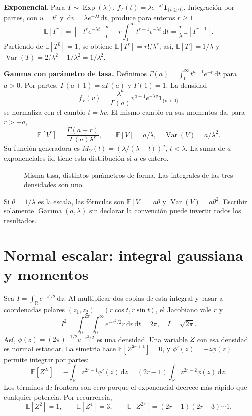 \documentclass[11pt,a4paper]{article}
\newcommand{\R}{\mathbb R}
\newcommand{\E}{\mathbb E}
\newcommand{\dd}{\,\mathrm d}
\newcommand{\ind}{\mathbf 1}
\DeclareMathOperator{\Var}{Var}
\newcommand{\topic}[2]{\clearpage\section{#1}\label{#2}}
\theoremstyle{definition}\newtheorem{definicion}[teorema]{Definición}
\begin{document}
\textbf{Exponencial.} Para $T\sim\operatorname{Exp}(\lambda)$,
$f_T(t)=\lambda e^{-\lambda t}\ind_{\{t\ge0\}}$.
Integración por partes, con $u=t^r$ y $\dd v=\lambda e^{-\lambda t}\dd t$,
produce para enteros $r\ge1$
\[
\E[T^r]
=\left[-t^re^{-\lambda t}\right]_0^\infty
+r\int_0^\infty t^{r-1}e^{-\lambda t}\dd t
=\frac r\lambda\E[T^{r-1}].
\]
Partiendo de $\E[T^0]=1$, se obtiene
$\E[T^r]=r!/\lambda^r$; así, $\E[T]=1/\lambda$ y
$\Var(T)=2/\lambda^2-1/\lambda^2=1/\lambda^2$.

\textbf{Gamma con parámetro de tasa.} Definimos
$\Gamma(a)=\int_0^\infty t^{a-1}e^{-t}\dd t$ para $a>0$.
Por partes, $\Gamma(a+1)=a\Gamma(a)$ y $\Gamma(1)=1$.
La densidad
\[
f_V(v)=\frac{\lambda^a}{\Gamma(a)}v^{a-1}e^{-\lambda v}
\ind_{\{v>0\}}
\]
se normaliza con el cambio $t=\lambda v$. El mismo cambio en sus momentos
da, para $r>-a$,
\[
\E[V^r]=\frac{\Gamma(a+r)}{\Gamma(a)\lambda^r},
\qquad \boxed{\E[V]=a/\lambda,\quad \Var(V)=a/\lambda^2}.
\]
Su función generadora es $M_V(t)=(\lambda/(\lambda-t))^a$, $t<\lambda$.
La suma de $a$ exponenciales iid tiene esta distribución si $a$ es entero.

\begin{figure}[H]\centering
{}
\caption{Misma tasa, distintos parámetros de forma. Las integrales de las tres densidades son uno.}
\end{figure}
\begin{cuidado}
Si $\theta=1/\lambda$ es la escala, las fórmulas son
$\E[V]=a\theta$ y $\Var(V)=a\theta^2$. Escribir solamente
$\operatorname{Gamma}(a,\lambda)$ sin declarar la convención puede invertir
todos los resultados.
\end{cuidado}

\topic{Normal escalar: integral gaussiana y momentos}{s05}
Sea $I=\int_{\R}e^{-z^2/2}\dd z$. Al multiplicar dos copias de esta
integral y pasar a coordenadas polares $(z_1,z_2)=(r\cos t,r\sin t)$,
el Jacobiano vale $r$ y
\[
I^2=\int_0^{2\pi}\int_0^\infty e^{-r^2/2}r\dd r\dd t=2\pi,
\quad I=\sqrt{2\pi}.
\]
Así, $\phi(z)=(2\pi)^{-1/2}e^{-z^2/2}$ es una densidad. Una variable
$Z$ con esa densidad es normal estándar. La simetría hace
$\E[Z^{2r+1}]=0$, y $\phi'(z)=-z\phi(z)$ permite integrar por partes:
\[
\E[Z^{2r}]
=-\int_{\R}z^{2r-1}\phi'(z)\dd z
=(2r-1)\int_{\R}z^{2r-2}\phi(z)\dd z.
\]
Los términos de frontera son cero porque el exponencial decrece más rápido
que cualquier potencia. Por recurrencia,
\[
\E[Z^2]=1,\qquad \E[Z^4]=3,\qquad
\E[Z^{2r}]=(2r-1)(2r-3)\cdots1.
\]
\end{document}
